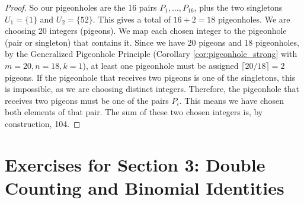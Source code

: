 \begin{enumerate}
\begin{proof}
    So our pigeonholes are the 16 pairs $P_1, \dots, P_{16}$, plus the two singletons $U_1 = \{1\}$ and $U_2 = \{52\}$.
    This gives a total of $16+2=18$ pigeonholes.
    We are choosing 20 integers (pigeons). We map each chosen integer to the pigeonhole (pair or singleton) that contains it.
    Since we have 20 pigeons and 18 pigeonholes, by the Generalized Pigeonhole Principle (Corollary \ref{cor:pigeonhole_strong} with $m=20, n=18, k=1$), at least one pigeonhole must be assigned $\lceil 20/18 \rceil = 2$ pigeons.
    If the pigeonhole that receives two pigeons is one of the singletons, this is impossible, as we are choosing distinct integers.
    Therefore, the pigeonhole that receives two pigeons must be one of the pairs $P_i$. This means we have chosen both elements of that pair. The sum of these two chosen integers is, by construction, 104.
    \end{proof}
\end{enumerate}

\section*{Exercises for Section 3: Double Counting and Binomial Identities}

